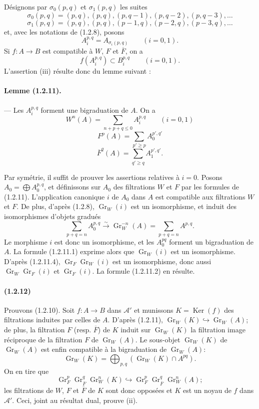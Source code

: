 \documentclass[10pt]{article}
\newcommand{\Gr}{\operatorname{Gr}}
\newcommand{\Ker}{\operatorname{Ker}}
\newcommand{\calA}{\mathcal A}
\newcommand{\iso}{\xrightarrow{\sim}}
\begin{document}
Désignons par $\sigma_0(p,q)$ et $\sigma_1(p,q)$ les suites
\[
\sigma_0(p,q)=(p,q),(p,q),(p,q-1),(p,q-2),(p,q-3),\ldots
\]
\[
\sigma_1(p,q)=(p,q),(p,q),(p-1,q),(p-2,q),(p-3,q),\ldots
\]
et, avec les notations de (1.2.8), posons
\[
A_i^{p,q}=A_{\sigma_i(p,q)}\qquad(i=0,1).
\]
Si $f:A\to B$ est compatible à $W$, $F$ et $\overline F$, on a
\[
\tag{1.2.10.1}
f(A_i^{p,q})\subset B_i^{p,q}\qquad(i=0,1).
\]
L'assertion (iii) résulte donc du lemme suivant :

\paragraph{Lemme (1.2.11).} --- Les $A_i^{p,q}$ forment une bigraduation de $A$. On a
\[
\tag{1.2.11.1}
W^n(A)=\sum_{n+p+q\le0} A_i^{p,q}\qquad(i=0,1)
\]
\[
\tag{1.2.11.2}
F^p(A)=\sum_{p'\ge p} A_0^{p',q'}
\]
\[
\tag{1.2.11.3}
\overline F^q(A)=\sum_{q'\ge q} A_1^{p',q'}.
\]

Par symétrie, il suffit de prouver les assertions relatives à $i=0$. Posons $A_0=\bigoplus A_0^{p,q}$, et définissons sur $A_0$ des filtrations $W$ et $F$ par les formules de (1.2.11). L'application canonique $i$ de $A_0$ dans $A$ est compatible aux filtrations $W$ et $F$. De plus, d'après (1.2.8), $\Gr_W(i)$ est un isomorphisme, et induit des isomorphismes d'objets gradués
\[
\tag{1.2.11.4}
\sum_{p+q=n} A_0^{p,q}\iso \Gr_W^{-n}(A)=\sum_{p+q=n}A^{p,q}.
\]
Le morphisme $i$ est donc un isomorphisme, et les $A_0^{pq}$ forment un bigraduation de $A$. La formule (1.2.11.1) exprime alors que $\Gr_W(i)$ est un isomorphisme. D'après (1.2.11.4), $\Gr_F\Gr_W(i)$ est un isomorphisme, donc aussi $\Gr_W\Gr_F(i)$ et $\Gr_F(i)$. La formule (1.2.11.2) en résulte.

\paragraph{(1.2.12)} Prouvons (1.2.10). Soit $f:A\to B$ dans $\calA'$ et munissons $K=\Ker(f)$ des filtrations induites par celles de $A$. D'après (1.2.11), $\Gr_W(K)\hookrightarrow\Gr_W(A)$; de plus, la filtration $F$ (resp. $\overline F$) de $K$ induit sur $\Gr_W(K)$ la filtration image réciproque de la filtration $F$ de $\Gr_W(A)$. Le sous-objet $\Gr_W(K)$ de $\Gr_W(A)$ est enfin compatible à la bigraduation de $\Gr_W(A)$:
\[
\Gr_W(K)=\bigoplus_{p,q}(\Gr_W(K)\cap A^{pq}).
\]
On en tire que
\[
\Gr_F^p\Gr_{\overline F}^{q}\Gr_W^n(K)\hookrightarrow \Gr_F^p\Gr_{\overline F}^{q}\Gr_W^n(A);
\]
les filtrations de $W$, $F$ et $\overline F$ de $K$ sont donc opposées et $K$ est un noyau de $f$ dans $\calA'$. Ceci, joint au résultat dual, prouve (ii).
\end{document}
